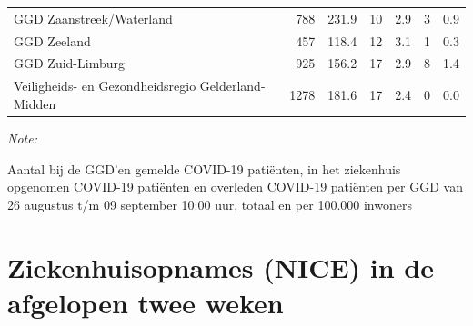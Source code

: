 \documentclass[
  english,
  man,floatsintext]{apa6}
\begin{document}
\begin{table}
\begin{threeparttable}
\begin{tabular}{lrrrrrr}
GGD Zaanstreek/Waterland & 788 & 231.9 & 10 & 2.9 & 3 & 0.9\\
GGD Zeeland & 457 & 118.4 & 12 & 3.1 & 1 & 0.3\\
GGD Zuid-Limburg & 925 & 156.2 & 17 & 2.9 & 8 & 1.4\\
Veiligheids- en Gezondheidsregio Gelderland-Midden & 1278 & 181.6 & 17 & 2.4 & 0 & 0.0\\
\bottomrule
\end{tabular}
\begin{tablenotes}
\item \textit{Note: } 
\item Aantal bij de GGD’en gemelde COVID-19 patiënten, in het ziekenhuis opgenomen COVID-19 patiënten en overleden COVID-19 patiënten per GGD van 26 augustus t/m 09 september 10:00 uur, totaal en per 100.000 inwoners
\end{tablenotes}
\end{threeparttable}
\endgroup{}
\end{table}

\newpage

\hypertarget{ziekenhuisopnames-nice-in-de-afgelopen-twee-weken}{%
\section{Ziekenhuisopnames (NICE) in de afgelopen twee weken}\label{ziekenhuisopnames-nice-in-de-afgelopen-twee-weken}}
\end{document}
